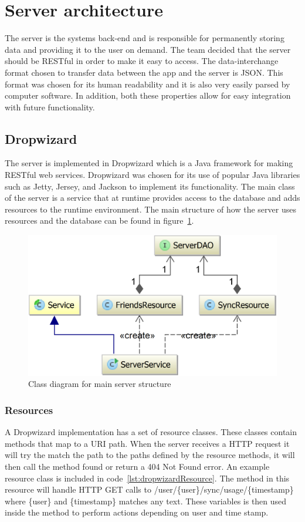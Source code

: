 \section{Server architecture}
\label{sec:arch_server}
The server is the systems back-end and is responsible for permanently storing data and providing it to the user on demand. The team decided that the server should be RESTful in order to make it easy to access. The data-interchange format chosen to transfer data between the app and the server is JSON. This format was chosen for its human readability and it is also very easily parsed by computer software. In addition, both these properties allow for easy integration with future functionality.

\subsection{Dropwizard}
The server is implemented in Dropwizard which is a Java framework for making RESTful web services. Dropwizard was chosen for its use of popular Java libraries such as Jetty, Jersey, and Jackson to implement its functionality. The main class of the server is a service that at runtime provides access to the database and adds resources to the runtime environment. The main structure of how the server uses resources and the database can be found in figure~\ref{fig:classDiagramServer}.

\begin{figure}[H]
\includegraphics[width=\textwidth]{ch/architecture/fig/classDiagramServer.png}
\caption{Class diagram for main server structure}
\label{fig:classDiagramServer}
\end{figure}

\subsubsection{Resources}
A Dropwizard implementation has a set of resource classes. These classes contain methods that map to a URI path. When the server receives a HTTP request it will try the match the path to the paths defined by the resource methods, it will then call the method found or return a 404 Not Found error. An example resource class is included in code~\ref{lst:dropwizardResource}. The method in this resource will handle HTTP GET calls to /user/\{user\}/sync/usage/\{timestamp\} where \{user\} and \{timestamp\} matches any text. These variables is then used inside the method to perform actions depending on user and time stamp.
\newline

